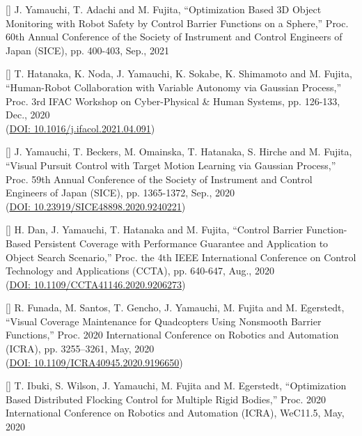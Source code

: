 \documentclass[letterpaper]{article}
\newcounter{conf}
\begin{document}
[]  
  J. Yamauchi, T. Adachi and M. Fujita,
  ``Optimization Based 3D Object Monitoring with Robot Safety by Control Barrier Functions on a Sphere,''
  Proc. 60th Annual Conference of the Society of Instrument and Control Engineers of Japan (SICE), pp. 400-403, Sep., 2021 \\
\addtocounter{conf}{-1}

[]  
  T. Hatanaka, K. Noda, J. Yamauchi, K. Sokabe, K. Shimamoto and M. Fujita,
  ``Human-Robot Collaboration with Variable Autonomy via Gaussian Process,''
  Proc. 3rd IFAC Workshop on Cyber-Physical \& Human Systems, pp. 126-133, Dec., 2020 \\ 
  (\href{https://www.sciencedirect.com/science/article/pii/S2405896321001774}{DOI: 10.1016/j.ifacol.2021.04.091}) \\
\addtocounter{conf}{-1}

[]  
  J. Yamauchi, T. Beckers, M. Omainska, T. Hatanaka, S. Hirche and M. Fujita,
  ``Visual Pursuit Control with Target Motion Learning via Gaussian Process,''
  Proc. 59th Annual Conference of the Society of Instrument and Control Engineers of Japan (SICE), pp. 1365-1372, Sep., 2020 \\ 
  (\href{https://ieeexplore.ieee.org/document/9240221}{DOI: 10.23919/SICE48898.2020.9240221}) \\
\addtocounter{conf}{-1}

[]  
  H. Dan, J. Yamauchi, T. Hatanaka and M. Fujita,
  ``Control Barrier Function-Based Persistent Coverage with Performance Guarantee and Application to Object Search Scenario,''
  Proc. the 4th IEEE International Conference on Control Technology and Applications (CCTA), pp. 640-647, Aug., 2020 \\ 
  (\href{https://ieeexplore.ieee.org/document/9206273}{DOI: 10.1109/CCTA41146.2020.9206273}) \\
\addtocounter{conf}{-1}

[]  
  R. Funada, M. Santos, T. Gencho, J. Yamauchi, M. Fujita and M. Egerstedt,
  ``Visual Coverage Maintenance for Quadcopters Using Nonsmooth Barrier Functions,''
  Proc. 2020 International Conference on Robotics and Automation (ICRA), pp. 3255--3261, May, 2020 \\
  (\href{https://ieeexplore.ieee.org/document/9196650}{DOI: 10.1109/ICRA40945.2020.9196650}) \\
\addtocounter{conf}{-1}

[]  
  T. Ibuki, S. Wilson, J. Yamauchi, M. Fujita and M. Egerstedt,
  ``Optimization Based Distributed Flocking Control for Multiple Rigid Bodies,''
  Proc. 2020 International Conference on Robotics and Automation (ICRA), WeC11.5, May, 2020 \\
\addtocounter{conf}{-1}
\end{document}
